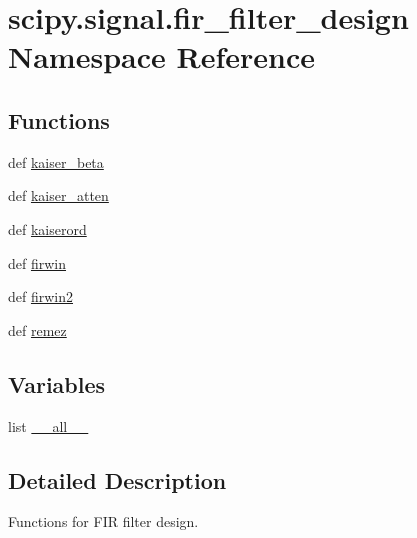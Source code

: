 \hypertarget{namespacescipy_1_1signal_1_1fir__filter__design}{}\section{scipy.\+signal.\+fir\+\_\+filter\+\_\+design Namespace Reference}
\label{namespacescipy_1_1signal_1_1fir__filter__design}
\subsection*{Functions}
\begin{DoxyCompactItemize}
\item 
def \hyperlink{namespacescipy_1_1signal_1_1fir__filter__design_ab00e8b8371ea973c81dc0fdb9000a50e}{kaiser\+\_\+beta}
\item 
def \hyperlink{namespacescipy_1_1signal_1_1fir__filter__design_a82a81e6f5d1b0c6ca6b1eebc0f111cc5}{kaiser\+\_\+atten}
\item 
def \hyperlink{namespacescipy_1_1signal_1_1fir__filter__design_af50bd63536ece8693c21f9239d715316}{kaiserord}
\item 
def \hyperlink{namespacescipy_1_1signal_1_1fir__filter__design_a1444c163418142db9f645741dcde167f}{firwin}
\item 
def \hyperlink{namespacescipy_1_1signal_1_1fir__filter__design_a67d5b6a50166dbbe76e6de81f63cb44e}{firwin2}
\item 
def \hyperlink{namespacescipy_1_1signal_1_1fir__filter__design_a3cfe72c6ac896c0454f11177ecb81f7c}{remez}
\end{DoxyCompactItemize}
\subsection*{Variables}
\begin{DoxyCompactItemize}
\item 
list \hyperlink{namespacescipy_1_1signal_1_1fir__filter__design_a10ccff89a03f313f32d8c4b5c0184a45}{\+\_\+\+\_\+all\+\_\+\+\_\+}
\end{DoxyCompactItemize}


\subsection{Detailed Description}
\begin{DoxyVerb}Functions for FIR filter design.\end{DoxyVerb}
 

